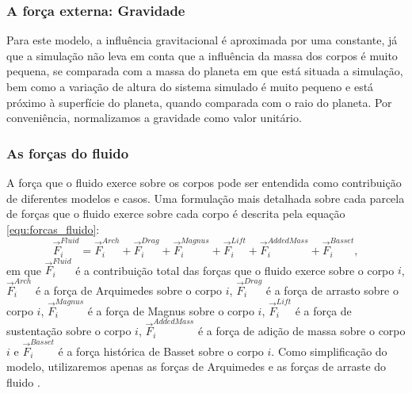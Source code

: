 \subsubsection{A força externa: Gravidade}
\label{subsubchap:Gravidade}
    Para este modelo, a influência gravitacional é aproximada por uma constante, já que a simulação não leva em conta que a influência da massa dos corpos é muito pequena, se comparada com a massa do planeta em que está situada a simulação, bem como a variação de altura do sistema simulado é muito pequeno e está próximo à superfície do planeta, quando comparada com o raio do planeta. Por conveniência, normalizamos a gravidade como valor unitário.

\subsubsection{As forças do fluido}
\label{subsubchap:Fluido}
    A força que o fluido exerce sobre os corpos pode ser entendida como contribuição de diferentes modelos e casos. Uma formulação mais detalhada sobre cada parcela de forças que o fluido exerce sobre cada corpo é descrita pela equação \ref{equ:forcas_fluido}:
\begin{equation}
    \label{equ:forcas_fluido}
    \vec{F}_{i}^{Fluid} = \vec{F}_{i}^{Arch} +\vec{F}_{i}^{Drag} +\vec{F}_{i}^{Magnus} +\vec{F}_{i}^{Lift} +\vec{F}_{i}^{AddedMass} +\vec{F}_{i}^{Basset},
\end{equation}
em que $\vec{F}_{i}^{Fluid}$ é a contribuição total das forças que o fluido exerce sobre o corpo $i$, $\vec{F}_{i}^{Arch}$ é a força de Arquimedes sobre o corpo $i$, $\vec{F}_{i}^{Drag}$ é a força de arrasto sobre o corpo $i$, $\vec{F}_{i}^{Magnus}$ é a força de Magnus sobre o corpo $i$, $\vec{F}_{i}^{Lift}$ é a força de sustentação sobre o corpo $i$, $\vec{F}_{i}^{AddedMass}$ é a força de adição de massa sobre o corpo $i$ e $\vec{F}_{i}^{Basset}$ é a força histórica de Basset sobre o corpo $i$. Como simplificação do modelo, utilizaremos apenas as forças de Arquimedes e as forças de arraste do fluido \cite{Fluid_Mechanics, Numerical_simulation_of_turbulent_sediment_transport, Maurin-Tese}.

